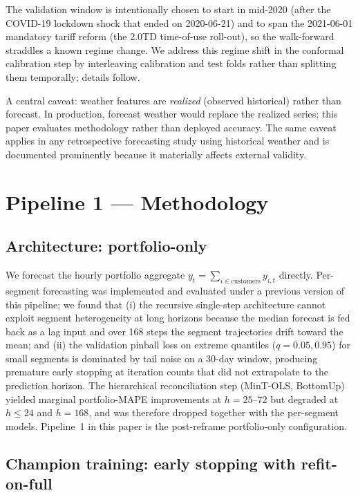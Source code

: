 \documentclass[11pt]{article}
\begin{document}
The validation window is intentionally chosen to start in mid-2020 (after
the COVID-19 lockdown shock that ended on 2020-06-21) and to span the
2021-06-01 mandatory tariff reform (the 2.0TD time-of-use roll-out), so
the walk-forward straddles a known regime change. We address this regime
shift in the conformal calibration step by interleaving calibration and
test folds rather than splitting them temporally; details follow.

A central caveat: weather features are \emph{realized} (observed
historical) rather than forecast. In production, forecast weather would
replace the realized series; this paper evaluates methodology rather than
deployed accuracy. The same caveat applies in any retrospective
forecasting study using historical weather and is documented prominently
because it materially affects external validity.

\section{Pipeline 1 --- Methodology}

\subsection{Architecture: portfolio-only}

We forecast the hourly portfolio aggregate
$y_t = \sum_{i \in \text{customers}} y_{i,t}$ directly. Per-segment
forecasting was implemented and evaluated under a previous version of this
pipeline; we found that (i) the recursive single-step architecture cannot
exploit segment heterogeneity at long horizons because the median forecast
is fed back as a lag input and over 168 steps the segment trajectories
drift toward the mean; and (ii) the validation pinball loss on extreme
quantiles ($q = 0.05, 0.95$) for small segments is dominated by tail noise
on a 30-day window, producing premature early stopping at iteration counts
that did not extrapolate to the prediction horizon. The hierarchical
reconciliation step (MinT-OLS, BottomUp) yielded marginal portfolio-MAPE
improvements at $h = 25$--$72$ but degraded at $h \leq 24$ and $h = 168$,
and was therefore dropped together with the per-segment models. Pipeline~1
in this paper is the post-reframe portfolio-only configuration.

\subsection{Champion training: early stopping with refit-on-full}
\end{document}
